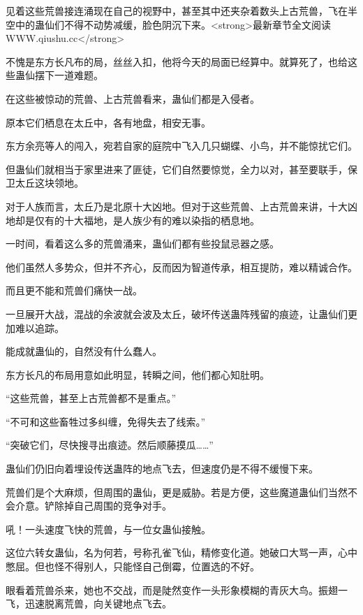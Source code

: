 
\begin{this_body}

见着这些荒兽接连涌现在自己的视野中，甚至其中还夹杂着数头上古荒兽，飞在半空中的蛊仙们不得不动势减缓，脸色阴沉下来。<strong>最新章节全文阅读WWW.qiushu.cc</strong>

不愧是东方长凡布的局，丝丝入扣，他将今天的局面已经算中。就算死了，也给这些蛊仙摆下一道难题。

在这些被惊动的荒兽、上古荒兽看来，蛊仙们都是入侵者。

原本它们栖息在太丘中，各有地盘，相安无事。

东方余亮等人的闯入，宛若自家的庭院中飞入几只蝴蝶、小鸟，并不能惊扰它们。

但蛊仙们就相当于家里进来了匪徒，它们自然要惊觉，全力以对，甚至要联手，保卫太丘这块领地。

对于人族而言，太丘乃是北原十大凶地。但对于这些荒兽、上古荒兽来讲，十大凶地却是仅有的十大福地，是人族少有的难以染指的栖息地。

一时间，看着这么多的荒兽涌来，蛊仙们都有些投鼠忌器之感。

他们虽然人多势众，但并不齐心，反而因为智道传承，相互提防，难以精诚合作。

而且更不能和荒兽们痛快一战。

一旦展开大战，混战的余波就会波及太丘，破坏传送蛊阵残留的痕迹，让蛊仙们更加难以追踪。

能成就蛊仙的，自然没有什么蠢人。

东方长凡的布局用意如此明显，转瞬之间，他们都心知肚明。

“这些荒兽，甚至上古荒兽都不是重点。”

“不可和这些畜牲过多纠缠，免得失去了线索。”

“突破它们，尽快搜寻出痕迹。然后顺藤摸瓜……”

蛊仙们仍旧向着埋设传送蛊阵的地点飞去，但速度仍是不得不缓慢下来。

荒兽们是个大麻烦，但周围的蛊仙，更是威胁。若是方便，这些魔道蛊仙们当然不会介意。铲除掉自己周围的竞争对手。

吼！一头速度飞快的荒兽，与一位女蛊仙接触。

这位六转女蛊仙，名为何若，号称孔雀飞仙，精修变化道。她破口大骂一声，心中憋屈。但也怪不得别人，只能怪自己倒霉，位置选的不好。

眼看着荒兽杀来，她也不交战，而是陡然变作一头形象模糊的青灰大鸟。振翅一飞，迅速脱离荒兽，向关键地点飞去。


\end{this_body}
